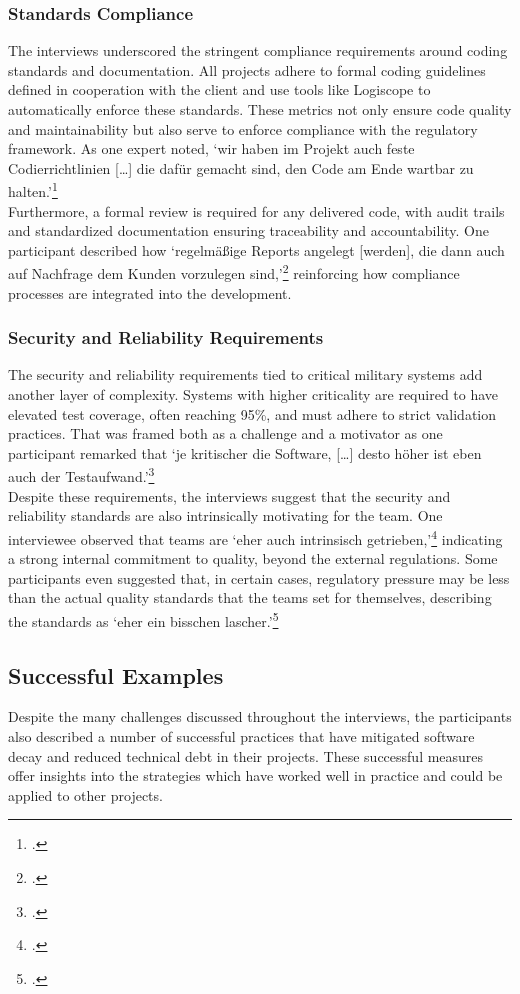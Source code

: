 \subsubsection{Standards Compliance}
The interviews underscored the stringent compliance requirements around coding standards and documentation. All projects adhere to formal coding guidelines defined in cooperation with the client and use tools like Logiscope to automatically enforce these standards.
These metrics not only ensure code quality and maintainability but also serve to enforce compliance with the regulatory framework. As one expert noted, `wir haben im Projekt auch feste Codierrichtlinien [\ldots] die dafür gemacht sind, den Code am Ende wartbar zu halten.'\footcite{Interview22025}\\
Furthermore, a formal review is required for any delivered code, with audit trails and standardized documentation ensuring traceability and accountability. One participant described how `regelmäßige Reports angelegt [werden], die dann auch auf Nachfrage dem Kunden vorzulegen sind,'\footcite{Interview22025} reinforcing how compliance processes are integrated into the development.

\subsubsection{Security and Reliability Requirements}
The security and reliability requirements tied to critical military systems add another layer of complexity. Systems with higher criticality are required to have elevated test coverage, often reaching 95\%, and must adhere to strict validation practices. That was framed both as a challenge and a motivator
as one participant remarked that `je kritischer die Software, [\ldots] desto höher ist eben auch der Testaufwand.'\footcite{Interview22025}\\
Despite these requirements, the interviews suggest that the security and reliability standards are also intrinsically motivating for the team. One interviewee observed that teams are `eher auch intrinsisch getrieben,'\footcite{Interview32025} indicating a strong internal commitment to quality, beyond the external regulations. 
Some participants even suggested that, in certain cases, regulatory pressure may be less than the actual quality standards that the teams set for themselves, describing the standards as `eher ein bisschen lascher.'\footcite{Interview32025}

\subsection{Successful Examples}
Despite the many challenges discussed throughout the interviews, the participants also described a number of successful practices that have mitigated software decay and reduced technical debt in their projects. These successful measures offer insights into the strategies which have worked well in practice and could be applied to other projects.

